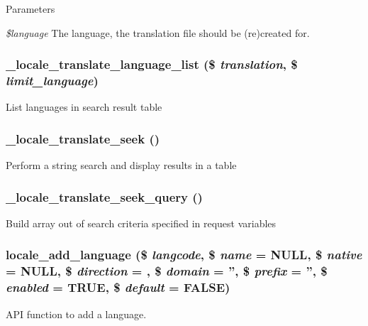 \begin{DoxyParams}{Parameters}
\item[{\em \$language}]The language, the translation file should be (re)created for. \end{DoxyParams}
\hypertarget{group__locale_gacf9e97475d1e1ffaaf336e3a943163a2}{
\subsubsection[{\_\-locale\_\-translate\_\-language\_\-list}]{\setlength{\rightskip}{0pt plus 5cm}\_\-locale\_\-translate\_\-language\_\-list (\$ {\em translation}, \/  \$ {\em limit\_\-language})}}
\label{group__locale_gacf9e97475d1e1ffaaf336e3a943163a2}
List languages in search result table \hypertarget{group__locale_ga006049082d29be75fd8ad396beda5883}{
\subsubsection[{\_\-locale\_\-translate\_\-seek}]{\setlength{\rightskip}{0pt plus 5cm}\_\-locale\_\-translate\_\-seek ()}}
\label{group__locale_ga006049082d29be75fd8ad396beda5883}
Perform a string search and display results in a table \hypertarget{group__locale_ga3afc18d03a7b2355e9328bc211acc4d1}{
\subsubsection[{\_\-locale\_\-translate\_\-seek\_\-query}]{\setlength{\rightskip}{0pt plus 5cm}\_\-locale\_\-translate\_\-seek\_\-query ()}}
\label{group__locale_ga3afc18d03a7b2355e9328bc211acc4d1}
Build array out of search criteria specified in request variables \hypertarget{group__locale_ga9fc28b9f10f5aaa7cb733dc0145018a2}{
\subsubsection[{locale\_\-add\_\-language}]{\setlength{\rightskip}{0pt plus 5cm}locale\_\-add\_\-language (\$ {\em langcode}, \/  \$ {\em name} = {\ttfamily NULL}, \/  \$ {\em native} = {\ttfamily NULL}, \/  \$ {\em direction} = {}, \/  \$ {\em domain} = {\ttfamily ''}, \/  \$ {\em prefix} = {\ttfamily ''}, \/  \$ {\em enabled} = {\ttfamily TRUE}, \/  \$ {\em default} = {\ttfamily FALSE})}}
\label{group__locale_ga9fc28b9f10f5aaa7cb733dc0145018a2}
API function to add a language.


